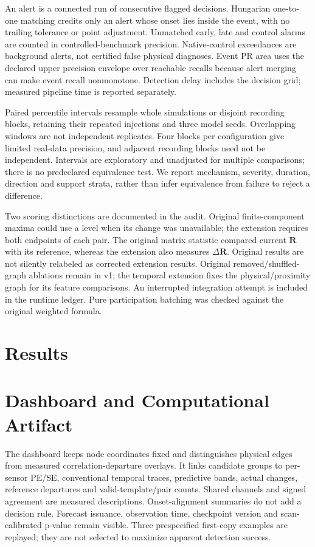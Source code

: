 \documentclass[conference]{IEEEtran}
\newcommand{\R}{\mathbf R}
\begin{document}
An alert is a connected run of consecutive flagged decisions. Hungarian
one-to-one matching credits only an alert whose onset lies inside the event,
with no trailing tolerance or point adjustment. Unmatched early, late and
control alarms are counted in controlled-benchmark precision. Native-control
exceedances are background alerts, not certified false physical diagnoses.
Event PR area uses the declared upper precision envelope over reachable recalls
because alert merging can make event recall nonmonotone. Detection delay includes
the decision grid; measured pipeline time is reported separately.

Paired percentile intervals resample whole simulations or disjoint recording
blocks, retaining their repeated injections and three model seeds. Overlapping
windows are not independent replicates. Four blocks per configuration give
limited real-data precision, and adjacent recording blocks need not be
independent. Intervals are exploratory and unadjusted for multiple comparisons;
there is no predeclared equivalence test. We report mechanism, severity,
duration, direction and support strata, rather than infer equivalence from
failure to reject a difference.

Two scoring distinctions are documented in the audit. Original finite-component
maxima could use a level when its change was unavailable; the extension requires
both endpoints of each pair. The original matrix statistic compared current
$\R$ with its reference, whereas the extension also measures $\Delta\R$.
Original results are not silently relabeled as corrected extension results.
Original removed/shuffled-graph ablations remain in v1; the temporal extension
fixes the physical/proximity graph for its feature comparisons.
An interrupted integration attempt is included in the runtime ledger. Pure
participation batching was checked against the original weighted formula.

\section{Results}


\section{Dashboard and Computational Artifact}
The dashboard keeps node coordinates fixed and distinguishes physical edges
from measured correlation-departure overlays. It links candidate groups to
per-sensor PE/SE, conventional temporal traces, predictive bands, actual changes,
reference departures and valid-template/pair counts. Shared channels and signed
agreement are measured descriptions. Onset-alignment summaries do not add a
decision rule. Forecast issuance, observation time, checkpoint version and
scan-calibrated p-value remain visible. Three prespecified first-copy examples
are replayed; they are not selected to maximize apparent detection success.
\end{document}
